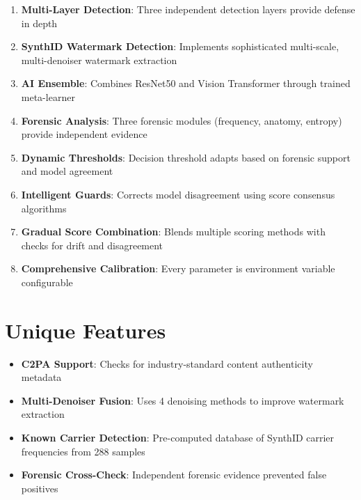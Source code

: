 \documentclass[12pt,a4paper]{book}
\begin{document}
\begin{itemize}
\begin{enumerate}
    \item \textbf{Multi-Layer Detection}: Three independent detection layers provide defense in depth
    
    \item \textbf{SynthID Watermark Detection}: Implements sophisticated multi-scale, multi-denoiser watermark extraction
    
    \item \textbf{AI Ensemble}: Combines ResNet50 and Vision Transformer through trained meta-learner
    
    \item \textbf{Forensic Analysis}: Three forensic modules (frequency, anatomy, entropy) provide independent evidence
    
    \item \textbf{Dynamic Thresholds}: Decision threshold adapts based on forensic support and model agreement
    
    \item \textbf{Intelligent Guards}: Corrects model disagreement using score consensus algorithms
    
    \item \textbf{Gradual Score Combination}: Blends multiple scoring methods with checks for drift and disagreement
    
    \item \textbf{Comprehensive Calibration}: Every parameter is environment variable configurable
\end{enumerate}

\section{Unique Features}

\begin{itemize}
    \item \textbf{C2PA Support}: Checks for industry-standard content authenticity metadata
    
    \item \textbf{Multi-Denoiser Fusion}: Uses 4 denoising methods to improve watermark extraction
    
    \item \textbf{Known Carrier Detection}: Pre-computed database of SynthID carrier frequencies from 288 samples
    
    \item \textbf{Forensic Cross-Check}: Independent forensic evidence prevented false positives
    

\end{itemize}
\end{itemize}
\end{document}
